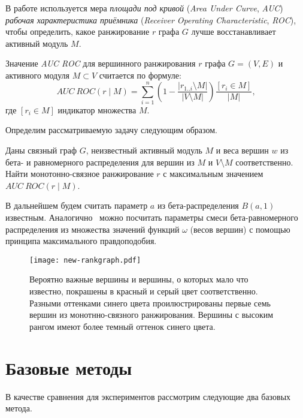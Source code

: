 В работе используется мера \emph{площади под кривой} (\emph{Area Under Curve},
\emph{AUC}) \emph{рабочая характеристика приёмника} (\emph{Receiver Operating
Characteristic}, \emph{ROC}), чтобы определить, какое ранжирование $r$ графа $G$ лучше
восстанавливает активный модуль $M$.

\begin{definition}
    Значение \emph{AUC ROC} для вершинного ранжирования $r$ графа $G = (V, E)$
    и активного модуля $M \subset V$ считается по формуле:
    \[ AUC~ROC(r \mid M) = \sum_{i=1}^n \left( 1 - \frac{|r_{1..i} \setminus M|}{|V
    \setminus M|} \right) \frac{[r_i \in M]}{|M|}, \]
    где $[r_i \in M]$ индикатор множества $M$.
\end{definition}

Определим рассматриваемую задачу следующим образом.
\begin{problem}
    Даны связный граф $G$, неизвестный активный модуль $M$ и веса вершин $w$ из
    бета- и равномерного распределения для вершин из $M$ и $V \setminus M$
    соответственно. Найти монотонно-связное ранжирование $r$ с максимальным
    значением $AUC~ROC(r \mid M)$.
\end{problem}

В дальнейшем будем считать параметр $a$ из бета-распределения $B(a, 1)$
известным. Аналогично~\cite{Dittrich2008a} можно посчитать параметры смеси
бета-равномерного распределения из множества значений функций $\omega$ (весов
вершин) с помощью принципа максимального правдоподобия.

\begin{figure}
    \centering
    \texttt{[image: new-rankgraph.pdf]}
    \caption{
        Вероятно важные вершины и вершины, о которых мало что известно, покрашены
        в красный и серый цвет соответственно.  Разными оттенками синего цвета
        проилюстрированы первые семь вершин из монотнно-связного ранжирования.
        Вершины с высоким рангом имеют более темный оттенок синего цвета.
    }%
    \label{fig:rankgraph}%
\end{figure}





\section{Базовые методы}
\label{sec_baseline}

В качестве сравнения для экспериментов рассмотрим следующие два базовых метода.


